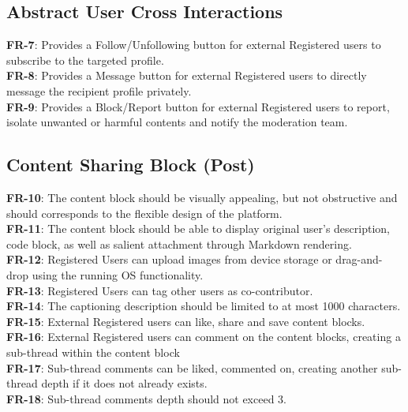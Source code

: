         \subsection{Abstract User Cross Interactions}
        \textbf{FR-7}: Provides a Follow/Unfollowing button for external Registered users to subscribe to the targeted profile.
        \\
        \textbf{FR-8}: Provides a Message button for external Registered users to directly message the recipient profile privately.
        \\
        \textbf{FR-9}: Provides a Block/Report button for external Registered users to report, isolate unwanted or harmful contents and notify the moderation team.
        
        \subsection{Content Sharing Block (Post)}
        \textbf{FR-10}: The content block should be visually appealing, but not obstructive and should corresponds to the flexible design of the platform.
        \\
        \textbf{FR-11}: The content block should be able to display original user's description, code block, as well as salient attachment through Markdown rendering.
        \\
        \textbf{FR-12}: Registered Users can upload images from device storage or drag-and-drop using the running OS functionality.
        \\
        \textbf{FR-13}: Registered Users can tag other users as co-contributor.
        \\
        \textbf{FR-14}: The captioning description should be limited to at most 1000 characters.
        \\
        \textbf{FR-15}: External Registered users can like, share and save content blocks.
        \\
        \textbf{FR-16}: External Registered users can comment on the content blocks, creating a sub-thread within the content block
        \\
        \textbf{FR-17}: Sub-thread comments can be liked, commented on, creating another sub-thread depth if it does not already exists.
        \\
        \textbf{FR-18}: Sub-thread comments depth should not exceed 3.

